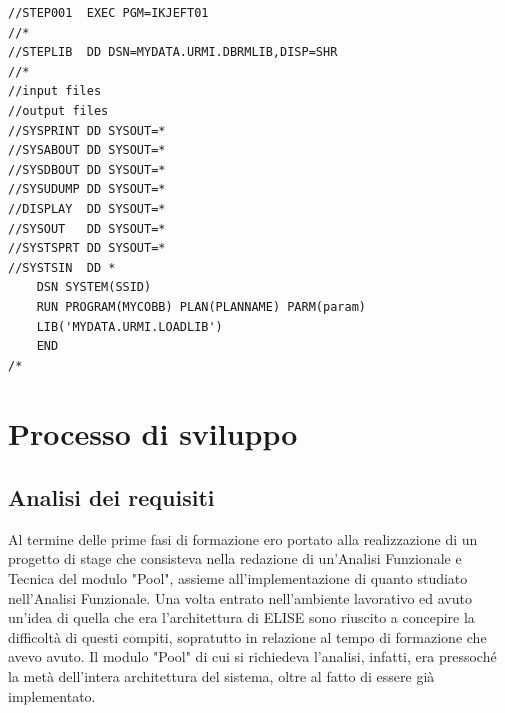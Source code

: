 \begin{lstlisting}[language=Cobol, caption={Struttura ideale di un programma JCL}]
//STEP001  EXEC PGM=IKJEFT01
//*
//STEPLIB  DD DSN=MYDATA.URMI.DBRMLIB,DISP=SHR
//*
//input files
//output files
//SYSPRINT DD SYSOUT=*
//SYSABOUT DD SYSOUT=*
//SYSDBOUT DD SYSOUT=*
//SYSUDUMP DD SYSOUT=*
//DISPLAY  DD SYSOUT=*
//SYSOUT   DD SYSOUT=*
//SYSTSPRT DD SYSOUT=*
//SYSTSIN  DD *
    DSN SYSTEM(SSID)
    RUN PROGRAM(MYCOBB) PLAN(PLANNAME) PARM(param)
    LIB('MYDATA.URMI.LOADLIB')
    END
/*
\end{lstlisting}

\section{Processo di sviluppo}
%

\subsection{Analisi dei requisiti}

Al termine delle prime fasi di formazione ero portato alla realizzazione di un progetto di stage che consisteva nella redazione di un'Analisi Funzionale e Tecnica del modulo "Pool", assieme all'implementazione di quanto studiato nell'Analisi Funzionale. Una volta entrato nell'ambiente lavorativo ed avuto un'idea di quella che era l'architettura di ELISE sono riuscito a concepire la difficoltà di questi compiti, sopratutto in relazione al tempo di formazione che avevo avuto. Il modulo "Pool" di cui si richiedeva l'analisi, infatti, era pressoché la metà dell'intera architettura del sistema, oltre al fatto di essere già implementato.\\

